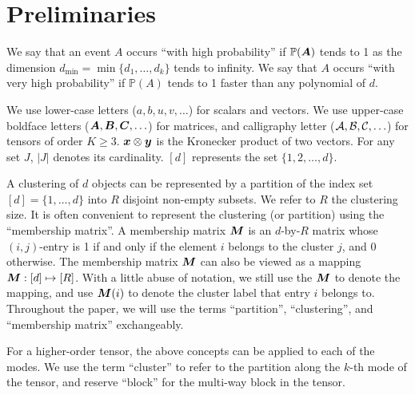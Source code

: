 \documentclass{article}
\begin{document}


\section{Preliminaries}

We say that an event $A$ occurs ``with high probability'' if $\mathbb{P}(\bm A)$ tends to 1 as the dimension $d_{\min}=\min\{d_1,\ldots,d_k\}$ tends to infinity. We say that $A$ occurs ``with very high probability'' if $\mathbb{P}(A)$ tends to 1 faster than any polynomial of $d$. 


We use lower-case letters ($a,b,u,v,\ldots$) for scalars and vectors. We use upper-case boldface letters ($\bm A,\bm B,\bm C,\ldots$) for matrices, and calligraphy letter ($\mathcal{A}, \mathcal{B}, \mathcal{C},\ldots$) for tensors of order $K\geq 3$. $\bm x\otimes \bm{y}$ is the Kronecker product of two vectors. For any set $J$, $|J|$ denotes its cardinality. $[d]$ represents the set $\{1,2,\ldots,d\}$. 

A clustering of $d$ objects can be represented by a partition of the index set $[d]=\{1,\ldots,d\}$ into $R$ disjoint non-empty subsets. We refer to $R$ the clustering size. It is often convenient to represent the clustering (or partition) using the ``membership matrix''. A membership matrix $\bm M$ is an $d$-by-$R$ matrix whose $(i,j)$-entry is 1 if and only if the element $i$ belongs to the cluster $j$, and 0 otherwise. 
The membership matrix $\bm M$ can also be viewed as a mapping $\bm M:[d]\mapsto[R]$. With a little abuse of notation, we still use the $\bm M$ to denote the mapping, and use $\bm M(i)$ to denote the cluster label that entry $i$ belongs to. Throughout the paper, we will use the terms ``partition'', ``clustering'', and ``membership matrix'' exchangeably. 

For a higher-order tensor, the above concepts can be applied to each of the modes. We use the term ``cluster'' to refer to the partition along the $k$-th mode of the tensor, and reserve ``block'' for the multi-way block in the tensor. 
\end{document}
